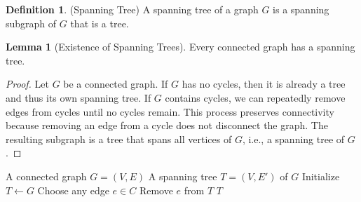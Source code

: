 \documentclass{article}
\theoremstyle{definition}
\newtheorem{lemma}{Lemma}
\newtheorem{definition}{Definition}
\begin{document}
\begin{definition} (Spanning Tree)
A spanning tree of a graph $G$ is a spanning subgraph of $G$ that is a tree.
\end{definition}

\begin{lemma}[Existence of Spanning Trees]
Every connected graph has a spanning tree.
\end{lemma}

\begin{proof}
Let $G$ be a connected graph. If $G$ has no cycles, then it is already a tree and thus its own spanning tree. If $G$ contains cycles, we can repeatedly remove edges from cycles until no cycles remain. This process preserves connectivity because removing an edge from a cycle does not disconnect the graph. The resulting subgraph is a tree that spans all vertices of $G$, i.e., a spanning tree of $G$.
\end{proof}

\begin{algorithm}
\caption{Spanning Tree Construction}
\begin{algorithmic}[1]
\Require A connected graph $G = (V,E)$
\Ensure A spanning tree $T = (V,E')$ of $G$
\State Initialize $T \gets G$
    \State Choose any edge $e \in C$
    \State Remove $e$ from $T$
\EndWhile
\State \Return $T$
\end{algorithmic}
\end{algorithm}
\end{document}
